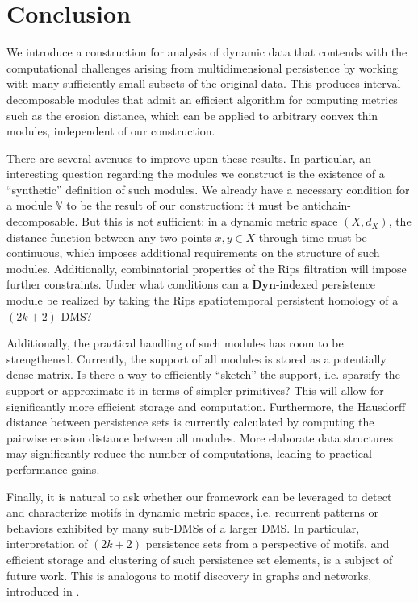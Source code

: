 \documentclass[a4paper,UKenglish,thm-restate]{article}
\theoremstyle{definition}
\def\bbv{\mathbb{V}}
\def\bdyn{\mathbf{Dyn}}
\begin{document}
\section{Conclusion}
    We introduce a construction for analysis of dynamic data that contends with the computational challenges arising from multidimensional persistence by working with many sufficiently small subsets of the original data. This produces interval-decomposable modules that admit an efficient algorithm for computing metrics such as the erosion distance, which can be applied to arbitrary convex thin modules, independent of our construction.

    There are several avenues to improve upon these results. In particular, an interesting question regarding the modules we construct is the existence of a ``synthetic'' definition of such modules. We already have a necessary condition for a module $\bbv$ to be the result of our construction: it must be antichain-decomposable. But this is not sufficient: in a dynamic metric space $(X, d_X)$, the distance function between any two points $x, y \in X$ through time must be continuous, which imposes additional requirements on the structure of such modules. Additionally, combinatorial properties of the Rips filtration will impose further constraints. Under what conditions can a $\bdyn$-indexed persistence module be realized by taking the Rips spatiotemporal persistent homology of a $(2k+2)$-DMS?

    Additionally, the practical handling of such modules has room to be strengthened. Currently, the support of all modules is stored as a potentially dense matrix. Is there a way to efficiently ``sketch'' the support, i.e. sparsify the support or approximate it in terms of simpler primitives? This will allow for significantly more efficient storage and computation. Furthermore, the Hausdorff distance between persistence sets is currently calculated by computing the pairwise erosion distance between all modules. More elaborate data structures may significantly reduce the number of computations, leading to practical performance gains.

    Finally, it is natural to ask whether our framework can be leveraged to detect and characterize motifs in dynamic metric spaces, i.e. recurrent patterns or behaviors exhibited by many sub-DMSs of a larger DMS. In particular, interpretation of $(2k+2)$ persistence sets from a perspective of motifs, and efficient storage and clustering of such persistence set elements, is a subject of future work. This is analogous to motif discovery in graphs and networks, introduced in \cite{networkmotifs}.
\end{document}
